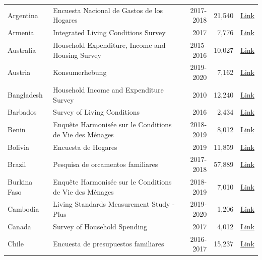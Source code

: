 \begin{ThreePartTable}
\begin{longtable}[t]{l|p{8cm}|r|r|c}
        Argentina & Encuesta Nacional de Gastos de los Hogares & 2017-2018 &  21,540  & \href{https://www.indec.gob.ar/indec/web/Nivel4-Tema-4-45-151}{Link} \\ 
        Armenia & Integrated Living Conditions Survey & 2017 &  7,776  & \href{https://microdata.worldbank.org/index.php/catalog/3591}{Link} \\ 
        Australia & Household Expenditure, Income and Housing Survey & 2015-2016 & 10,027 & \href{https://www.abs.gov.au/AUSSTATS/abs@.nsf/Lookup/6503.0Main+Features12015-16?OpenDocument}{Link}  \\
        Austria & Konsumerhebung & 2019-2020 &  7,162  & \href{https://www.statistik.at/ueber-uns/erhebungen/personen-und-haushaltserhebungen/konsumerhebung}{Link} \\ 
        Bangladesh & Household Income and Expenditure Survey & 2010 &  12,240  & \href{http://data.bbs.gov.bd/index.php/catalog/67}{Link} \\ 
        Barbados & Survey of Living Conditions & 2016 &  2,434  & \href{https://publications.iadb.org/en/barbados-survey-living-conditions-2016}{Link} \\ 
        Benin & Enquête Harmonisée sur le Conditions de Vie des Ménages & 2018-2019 &  8,012  & \href{https://microdata.worldbank.org/index.php/catalog/4291}{Link} \\ 
        Bolivia & Encuesta de Hogares & 2019 &  11,859  & \href{https://www.ine.gob.bo/index.php/estadisticas-sociales/vivienda-y-servicios-basicos/encuestas-de-hogares-vivienda/}{Link} \\ 
        Brazil & Pesquisa de orcamentos familiares & 2017-2018 &  57,889  & \href{https://www.ibge.gov.br/en/statistics/social/population/25610-pof-2017-2018-pof-en.html?=\&t=downloads}{Link} \\ 
        Burkina Faso & Enquête Harmonisée sur le Conditions de Vie des Ménages & 2018-2019 &  7,010  & \href{https://microdata.worldbank.org/index.php/catalog/4290}{Link} \\ 
        Cambodia & Living Standards Measurement Study - Plus & 2019-2020 &  1,206  & \href{https://microdata.worldbank.org/index.php/catalog/study/KHM\_2019\_LSMS-PLUS\_v02\_M}{Link} \\ 
        Canada & Survey of Household Spending & 2017 &  4,012  & \href{https://www150.statcan.gc.ca/n1/en/catalogue/62M0004X}{Link} \\ 
        Chile & Encuesta de presupuestos familiares & 2016-2017 &  15,237  & \href{https://www.ine.cl/estadisticas/sociales/ingresos-y-gastos/encuesta-de-presupuestos-familiares}{Link} \\ 

\end{longtable}
\end{ThreePartTable}
